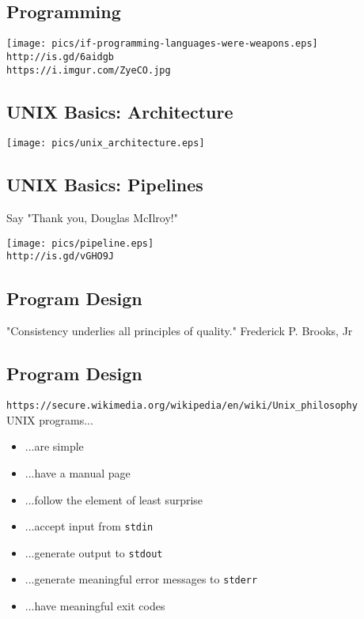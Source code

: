 \documentclass[xga]{xdvislides}
\begin{document}
\subsection{Programming}
\begin{center}
\texttt{[image: pics/if-programming-languages-were-weapons.eps]} \\
\vspace{.5in}
\verb+http://is.gd/6aidgb+ \\
\verb+https://i.imgur.com/ZyeCO.jpg+
\end{center}


\subsection{UNIX Basics: Architecture}
\begin{center}
\texttt{[image: pics/unix\_architecture.eps]}
\end{center}

\subsection{UNIX Basics: Pipelines}
Say "Thank you, Douglas McIlroy!"
\begin{center}
\texttt{[image: pics/pipeline.eps]} \\
\verb+http://is.gd/vGHO9J+ \\
\end{center}

\subsection{Program Design}
\vspace*{\fill}
\Huge
\begin{center}
"Consistency underlies all principles of quality." Frederick P. Brooks, Jr
\end{center}
\Normalsize
\vspace*{\fill}


\subsection{Program Design}
\verb+https://secure.wikimedia.org/wikipedia/en/wiki/Unix_philosophy+ \\

UNIX programs...
\begin{itemize}
	\item ...are simple
	\item ...have a manual page
	\item ...follow the element of least surprise
	\item ...accept input from {\tt stdin}
	\item ...generate output to {\tt stdout}
	\item ...generate meaningful error messages to {\tt stderr}
	\item ...have meaningful exit codes
\end{itemize}
\end{document}
